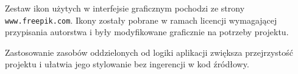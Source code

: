 Zestaw ikon użytych w interfejsie graficznym pochodzi ze strony \texttt{www.freepik.com}. Ikony zostały pobrane w ramach licencji wymagającej przypisania autorstwa i były modyfikowane graficznie na potrzeby projektu.  

Zastosowanie zasobów oddzielonych od logiki aplikacji zwiększa przejrzystość projektu i ułatwia jego stylowanie bez ingerencji w kod źródłowy.
